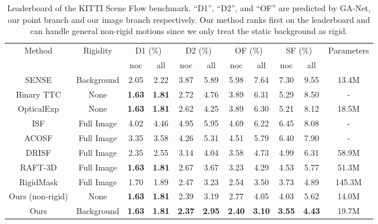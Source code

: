 \documentclass[10pt,twocolumn,letterpaper]{article}
\begin{document}
\begin{table*}
    \centering
    \begin{tabular}{c|c|cc|cc|cc|cc|c}
    \hline
    \multirow{2}{*}{Method} & \multirow{2}{*}{Rigidity} & \multicolumn{2}{c|}{D1 (\%)} & \multicolumn{2}{c|}{D2 (\%)} & \multicolumn{2}{c|}{OF (\%)} & \multicolumn{2}{c|}{SF (\%)} & \multirow{2}{*}{Parameters} \\
    & & noc & all & noc & all & noc & all & noc & all & \\
    \hline
    SENSE \cite{jiang2019sense} & Background & 2.05 & 2.22 & 3.87 & 5.89 & 5.98 & 7.64 & 7.30 & 9.55 & 13.4M \\
    Binary TTC \cite{badki2021binaryttc} & None & \textbf{1.63} & \textbf{1.81} & 2.72 & 4.76 & 3.89 & 6.31 & 5.29 & 8.50 & - \\
    OpticalExp \cite{yang2020opticalexp} & None & \textbf{1.63} & \textbf{1.81} & 2.62 & 4.25 & 3.89 & 6.30 & 5.21 & 8.12 & 18.5M \\
    ISF \cite{behl2017isf} & Full Image & 4.02 & 4.46 & 4.95 & 5.95 & 4.69 & 6.22 & 6.45 & 8.08 & - \\
    ACOSF \cite{li2021acosf} & Full Image & 3.35 & 3.58 & 4.26 & 5.31 & 4.51 & 5.79 & 6.40 & 7.90 & - \\
    DRISF \cite{ma2019drisf} & Full Image & 2.35 & 2.55 & 3.14 & 4.04 & 3.58 & 4.73 & 4.99 & 6.31 & 58.9M \\
    RAFT-3D \cite{teed2021raft3d} & Full Image & \textbf{1.63} & \textbf{1.81} & 2.67 & 3.67 & 3.23 & 4.29 & 4.53 & 5.77 & 51.3M \\
    RigidMask \cite{yang2021rigidmask} & Full Image & 1.70 & 1.89 & 2.47 & 3.23 & 2.54 & 3.50 & 3.73 & 4.89 & 145.3M \\
    \hline
    Ours (non-rigid) & None & \textbf{1.63} & \textbf{1.81} & 2.39 & 3.19 & 2.77 & 4.05 & 4.03 & 5.62 & 14.0M \\
    Ours & Background & \textbf{1.63} & \textbf{1.81} & \textbf{2.37} & \textbf{2.95} & \textbf{2.40} & \textbf{3.10} & \textbf{3.55} & \textbf{4.43} & 19.7M \\
    \end{tabular}
    \vspace{-5pt}
    \caption{Leaderboard of the KITTI Scene Flow benchmark. ``D1'', ``D2'', and ``OF'' are predicted by GA-Net, our point branch and our image branch respectively. Our method ranks first on the leaderboard and can handle general non-rigid motions since we only treat the static background as rigid.}
    \vspace{-10pt}
    \label{tab:main-kitti}
\end{table*}
\end{document}
